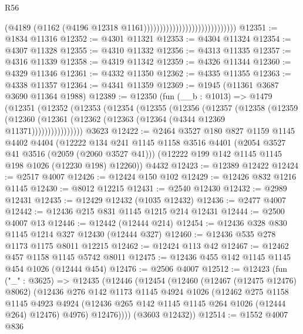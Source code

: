 \begin{lexlean}{R56}
\begin{coremodule}
                                                        (@4189
                                                          (@1162
                                                            (@4196
                                                              @12318
                                                              @1161)))))))))))))))))))))))))))))
@12351 := @1834 @11316
@12352 := @4301 @11321
@12353 := @4304 @11324
@12354 := @4307 @11328
@12355 := @4310 @11332
@12356 := @4313 @11335
@12357 := @4316 @11339
@12358 := @4319 @11342
@12359 := @4326 @11344
@12360 := @4329 @11346
@12361 := @4332 @11350
@12362 := @4335 @11355
@12363 := @4338 @11357
@12364 := @4341 @11359
@12369 := @1945 (@11361 @3687 @3690 @11364 @1988)
@12389 := @12350
    (fun (__b : @1013) =>
    @1479
      (@12351
        (@12352
          (@12353
            (@12354
              (@12355
                (@12356
                  (@12357
                    (@12358
                      (@12359
                        (@12360 (@12361 (@12362 (@12363 (@12364 (@4344 @12369 @11371))))))))))))))))
    @3623
@12422 := @2464
    @3527
    @180
    @827
    @1159
    @1145
    @4402
    @4404
    (@12222
      @134
      @241
      @1145
      @1158
      @3516
      @4401
      (@2054 @3527 @41 @3516 (@2059 (@2060 @3527 @41)))
      (@12222 @199 @142 @1145 @1145 @198 @1026 (@12230 @198) @12260))
    @4432
@12423 := @12389 @12422
@12424 := @2517 @4007
@12426 := @12424 @150 @102
@12429 := @12426 @832 @1216 @1145
@12430 := @8012 @12215
@12431 := @2540 @12430
@12432 := @2989 @12431
@12435 := @12429 @12432 (@1035 @12432)
@12436 := @2477 @4007
@12442 := @12436 @215 @831 @1145 @1215 @214 @12431
@12444 := @2500 @4007 @13
@12446 := @12442 (@12444 @214)
@12454 := @12436 @328 @830 @1145 @1214 @327 @12430 (@12444 @327)
@12460 := @12436 @535 @278 @1173 @1175 @8011 @12215
@12462 := @12424 @113 @42
@12467 := @12462 @457 @1158 @1145 @5742 @8011
@12475 := @12436 @455 @142 @1145 @1145 @454 @1026 (@12444 @454)
@12476 := @2506 @4007
@12512 := @12423
    (fun ("_" : @3625) =>
    @12435
      (@12446
        (@12454
          (@12460
            (@12467 (@12475 @12476) @8062)
            (@12436
              @276
              @142
              @1173
              @1145
              @4924
              @1026
              (@12462
                @275
                @1158
                @1145
                @4923
                @4924
                (@12436 @265 @142 @1145 @1145 @264 @1026 (@12444 @264) @12476)
                @4976)
              @12476))))
      (@3603 @12432))
@12514 := @1552 @4007 @836

\end{coremodule}
\end{lexlean}
